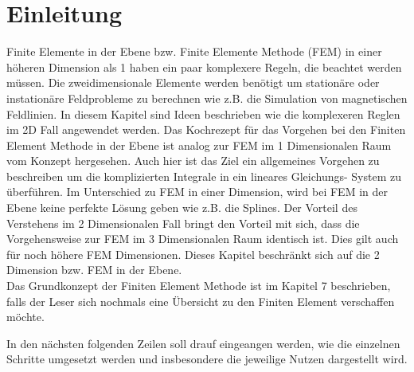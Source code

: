 %
%
%
\section{Einleitung\label{fem:section:einleitung}}
Finite Elemente in der Ebene bzw. Finite Elemente Methode (FEM) in einer höheren Dimension als 1 haben ein paar komplexere Regeln, die beachtet werden müssen. Die zweidimensionale Elemente werden benötigt um stationäre oder instationäre Feldprobleme zu berechnen wie z.B. die Simulation von magnetischen Feldlinien. In diesem Kapitel sind Ideen beschrieben wie die komplexeren Reglen im 2D Fall angewendet werden. Das Kochrezept für das Vorgehen bei den Finiten Element Methode in der Ebene ist analog zur FEM im 1 Dimensionalen Raum vom Konzept hergesehen. Auch hier ist das Ziel ein allgemeines Vorgehen zu beschreiben um die komplizierten Integrale in ein lineares Gleichungs- System zu überführen. Im Unterschied zu FEM in einer Dimension, wird bei FEM in der Ebene keine perfekte Lösung geben wie z.B. die Splines. Der Vorteil des Verstehens im 2 Dimensionalen Fall bringt den Vorteil mit sich, dass die Vorgehensweise zur FEM im 3 Dimensionalen Raum identisch ist. Dies gilt auch für noch höhere FEM Dimensionen. Dieses  Kapitel beschränkt sich auf die 2 Dimension bzw. FEM in der Ebene. \\
Das Grundkonzept der Finiten Element Methode ist im Kapitel 7 beschrieben, falls der Leser sich nochmals eine Übersicht zu den Finiten Element verschaffen möchte.

In den nächsten folgenden Zeilen soll drauf eingeangen werden, wie die einzelnen Schritte umgesetzt werden und insbesondere die jeweilige Nutzen dargestellt wird.

